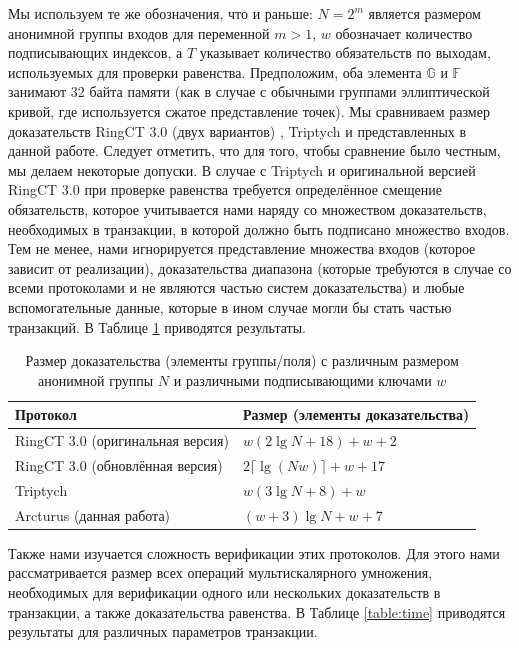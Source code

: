 \documentclass{article}
\newcommand{\F}{\mathbb{F}}
\theoremstyle{definition}
\begin{document}
Мы используем те же обозначения, что и раньше: $N = 2^m$ является размером анонимной группы входов для переменной $m > 1$, $w$ обозначает количество подписывающих индексов, а $T$ указывает количество обязательств по выходам, используемых для проверки равенства.
Предположим, оба элемента \begin{math}\mathbb{G}\end{math} и $\F$ занимают $32$ байта памяти (как в случае с обычными группами эллиптической кривой, где используется сжатое представление точек). Мы сравниваем размер доказательств RingCT 3.0 (двух вариантов) \cite{rct3}, Triptych \cite{triptych} и представленных в данной работе.
Следует отметить, что для того, чтобы сравнение было честным, мы делаем некоторые допуски.
В случае с Triptych и оригинальной версией RingCT 3.0 при проверке равенства требуется определённое смещение обязательств, которое учитывается нами наряду со множеством доказательств, необходимых в транзакции, в которой должно быть подписано множество входов.
Тем не менее, нами игнорируется представление множества входов (которое зависит от реализации), доказательства диапазона (которые требуются в случае со всеми протоколами и не являются частью систем доказательства) и любые вспомогательные данные, которые в ином случае могли бы стать частью транзакций.
В Таблице \ref{table:size} приводятся результаты.

\begin{table}
\centering
\begin{tabular}{|ll|}
\hline
Протокол & Размер (элементы доказательства) \\
\hline
RingCT 3.0 (оригинальная версия) \cite{rct3} & $w(2 \lg N + 18) + w + 2$ \\
RingCT 3.0 (обновлённая версия) \cite{rct3} & $2\lceil \lg(Nw) \rceil + w + 17$ \\
Triptych \cite{triptych} & $w(3 \lg N + 8) + w$ \\
Arcturus (данная работа) & $(w + 3)\lg N + w + 7$ \\
\hline
\end{tabular}
\caption{Размер доказательства (элементы группы/поля) с различным размером анонимной группы $N$ и различными подписывающими ключами $w$}
\label{table:size}
\end{table}

Также нами изучается сложность верификации этих протоколов.
Для этого нами рассматривается размер всех операций мультискалярного умножения, необходимых для верификации одного или нескольких доказательств в транзакции, а также доказательства равенства.
В Таблице \ref{table:time} приводятся результаты для различных параметров транзакции.
\end{document}
